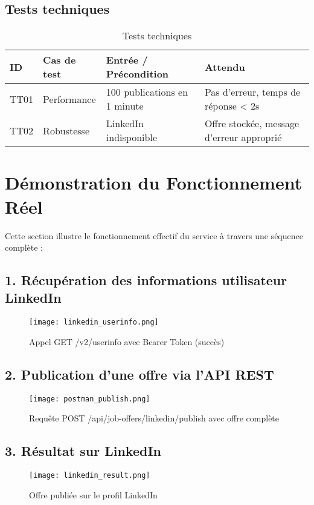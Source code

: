 \documentclass[a4paper,12pt]{report}
\begin{document}
\section{Tests techniques}
\begin{table}[H]
\centering
\begin{tabular}{|l|p{5cm}|p{5cm}|p{4cm}|}
\hline
\textbf{ID} & \textbf{Cas de test} & \textbf{Entrée / Précondition} & \textbf{Attendu} \\
\hline
TT01 & Performance & 100 publications en 1 minute & Pas d'erreur, temps de réponse < 2s \\
\hline
TT02 & Robustesse & LinkedIn indisponible & Offre stockée, message d'erreur approprié \\
\hline
\end{tabular}
\caption{Tests techniques}
\end{table}

\chapter{Démonstration du Fonctionnement Réel}

Cette section illustre le fonctionnement effectif du service à travers une séquence complète :

\section{1. Récupération des informations utilisateur LinkedIn}
\begin{figure}[H]
    \centering
    \texttt{[image: linkedin\_userinfo.png]}
    \caption{Appel GET /v2/userinfo avec Bearer Token (succès)}
\end{figure}

\section{2. Publication d'une offre via l'API REST}
\begin{figure}[H]
    \centering
    \texttt{[image: postman\_publish.png]}
    \caption{Requête POST /api/job-offers/linkedin/publish avec offre complète}
\end{figure}

\section{3. Résultat sur LinkedIn}
\begin{figure}[H]
    \centering
    \texttt{[image: linkedin\_result.png]}
    \caption{Offre publiée sur le profil LinkedIn}
\end{figure}
\end{document}

